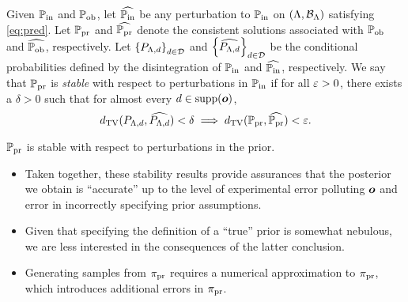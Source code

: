 \begin{frame}[t]
\begin{defn}\label{defn:stableprior}
Given $\operatorname*{\mathbb{P}_{in}}$ and $\operatorname*{\mathbb{P}_{ob}}$, let $\widehat{\operatorname*{\mathbb{P}_{in}}}$ be any perturbation to $\operatorname*{\mathbb{P}_{in}}$ on $({\Lambda}, \mathcal{B}_{{\Lambda}})$ satisfying \eqref{eq:pred}. 
Let $\operatorname*{\mathbb{P}_{pr}}$ and $\widehat{\operatorname*{\mathbb{P}_{pr}}}$ denote the consistent solutions associated with $\operatorname*{\mathbb{P}_{ob}}$ and $\widehat{\operatorname*{\mathbb{P}_{ob}}}$, respectively. 
Let $\left\{P_{{\Lambda}, d}\right\}_{d\in\mathcal{D}}^{}$ and $\left\{\widehat{P_{{\Lambda}, d}}\right\}_{d\in\mathcal{D}}^{}$ be the conditional probabilities defined by the disintegration of $\operatorname*{\mathbb{P}_{in}}$ and $\widehat{\operatorname*{\mathbb{P}_{in}}}$, respectively. 
We say that $\operatorname*{\mathbb{P}_{pr}}$ is \emph{stable} with respect to perturbations in $\operatorname*{\mathbb{P}_{in}}$ if for all $\varepsilon > 0$, there exists a $\delta > 0$ such that for almost every $d\in\text{supp}(\operatorname*{\boldsymbol{o}})$, 
\begin{equation}\label{eq:stableprior}
d_{\text{TV}} (P_{{\Lambda}, d}, \widehat{P_{{\Lambda}, d}}) < \delta \implies d_{\text{TV}} (\operatorname*{\mathbb{P}_{pr}}, \widehat{\operatorname*{\mathbb{P}_{pr}}}) < \varepsilon.
\end{equation}
\end{defn}

\begin{theorem}
$\operatorname*{\mathbb{P}_{pr}}$ is stable with respect to perturbations in the prior.
\label{thm:stableprior}
\end{theorem}


\end{frame}

\begin{frame}[t]
\begin{itemize}

	\item <1->Taken together, these stability results provide assurances that the posterior we obtain is ``accurate'' up to the level of experimental error polluting $\operatorname*{\boldsymbol{o}}$ and error in incorrectly specifying prior assumptions. 
	\item <2-> Given that specifying the definition of a ``true'' prior is somewhat nebulous, we are less interested in the consequences of the latter conclusion.
	\item <3-> Generating samples from $\operatorname*{\pi_{pr}}$ requires a numerical approximation to $\operatorname*{\pi_{pr}}$, which introduces additional errors in $\operatorname*{\pi_{pr}}$.
	
\end{itemize}

\end{frame}


